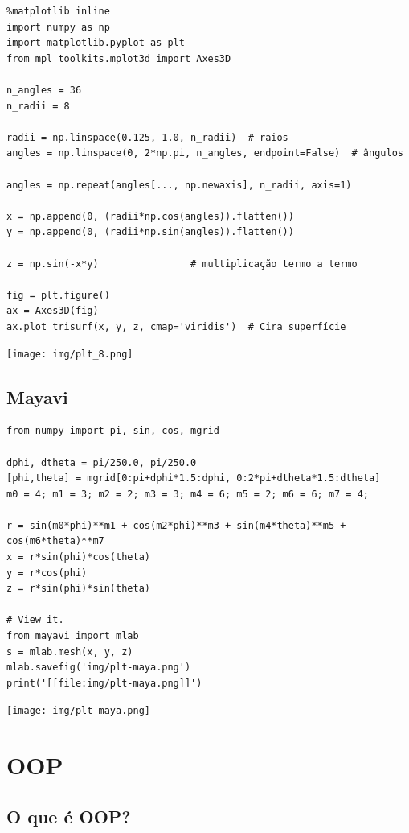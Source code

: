 \documentclass[presentation]{beamer}
\begin{document}
\begin{verbatim}
%matplotlib inline
import numpy as np
import matplotlib.pyplot as plt
from mpl_toolkits.mplot3d import Axes3D

n_angles = 36
n_radii = 8

radii = np.linspace(0.125, 1.0, n_radii)  # raios
angles = np.linspace(0, 2*np.pi, n_angles, endpoint=False)  # ângulos

angles = np.repeat(angles[..., np.newaxis], n_radii, axis=1)

x = np.append(0, (radii*np.cos(angles)).flatten())
y = np.append(0, (radii*np.sin(angles)).flatten())

z = np.sin(-x*y)                # multiplicação termo a termo

fig = plt.figure()
ax = Axes3D(fig)
ax.plot_trisurf(x, y, z, cmap='viridis')  # Cira superfície
\end{verbatim}

\texttt{[image: img/plt\_8.png]}


\subsection{Mayavi}
\label{sec:orgheadline40}

\begin{verbatim}
from numpy import pi, sin, cos, mgrid

dphi, dtheta = pi/250.0, pi/250.0
[phi,theta] = mgrid[0:pi+dphi*1.5:dphi, 0:2*pi+dtheta*1.5:dtheta]
m0 = 4; m1 = 3; m2 = 2; m3 = 3; m4 = 6; m5 = 2; m6 = 6; m7 = 4;

r = sin(m0*phi)**m1 + cos(m2*phi)**m3 + sin(m4*theta)**m5 + cos(m6*theta)**m7
x = r*sin(phi)*cos(theta)
y = r*cos(phi)
z = r*sin(phi)*sin(theta)

# View it.
from mayavi import mlab
s = mlab.mesh(x, y, z)
mlab.savefig('img/plt-maya.png')
print('[[file:img/plt-maya.png]]')
\end{verbatim}

\texttt{[image: img/plt-maya.png]}

\section{OOP}
\label{sec:orgheadline51}

\subsection{O que é OOP?}
\label{sec:orgheadline42}
\end{document}
